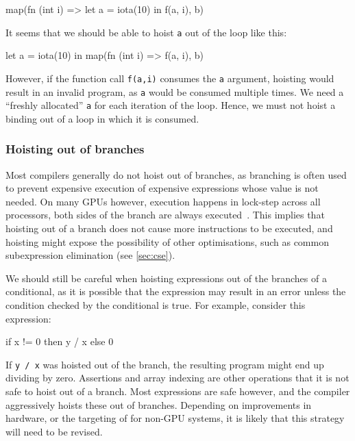 \begin{colorcode}
map(fn (int i) =>
      let a = iota(10) in
      f(a, i),
    b)
\end{colorcode}

It seems that we should be able to hoist \texttt{a} out of the loop
like this:

\begin{colorcode}
let a = iota(10) in
map(fn (int i) =>
      f(a, i),
    b)
\end{colorcode}

However, if the function call \texttt{f(a,i)} consumes the \texttt{a}
argument, hoisting would result in an invalid program, as \texttt{a}
would be consumed multiple times.  We need a ``freshly allocated''
\texttt{a} for each iteration of the loop.  Hence, we must not hoist a
binding out of a loop in which it is consumed.

\subsubsection{Hoisting out of branches}

Most compilers generally do not hoist out of branches, as branching is
often used to prevent expensive execution of expensive expressions
whose value is not needed.  On many GPUs however, execution happens in
lock-step across all processors, both sides of the branch are always
executed~\cite{reducing-branch-divergence}.  This implies that
hoisting out of a branch does not cause more instructions to be
executed, and hoisting might expose the possibility of other
optimisations, such as common subexpression elimination (see
\cref{sec:cse}).

We should still be careful when hoisting expressions out of the
branches of a conditional, as it is possible that the expression may
result in an error unless the condition checked by the conditional is
true.  For example, consider this expression:

\begin{colorcode}
if x != 0 then y / x
          else 0
\end{colorcode}

If \texttt{y / x} was hoisted out of the branch, the resulting program
might end up dividing by zero.  Assertions and array indexing are
other operations that it is not safe to hoist out of a branch.  Most
expressions are safe however, and the \LO{} compiler aggressively
hoists these out of branches.  Depending on improvements in hardware,
or the targeting of \LO{} for non-GPU systems, it is likely that this
strategy will need to be revised.

